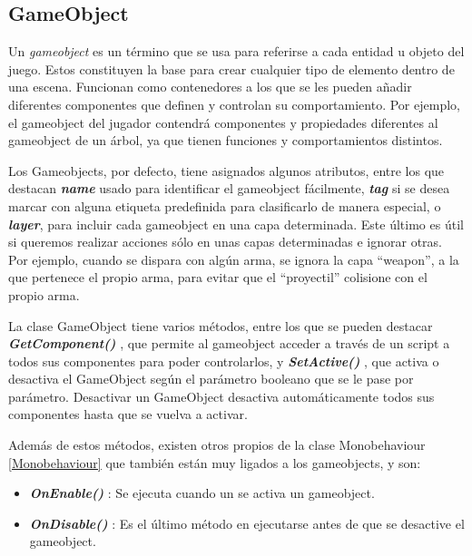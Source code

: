 \subsection{GameObject}
Un \textit{gameobject} \cite{doc:GameObject} es un término que se usa para referirse a cada entidad u objeto del juego. Estos constituyen la base para crear cualquier tipo de elemento dentro de una escena. Funcionan como contenedores a los que se les pueden añadir diferentes componentes que definen y controlan su comportamiento. Por ejemplo, el gameobject del jugador contendrá componentes y propiedades diferentes al gameobject de un árbol, ya que tienen funciones y comportamientos distintos.

Los Gameobjects, por defecto, tiene asignados algunos atributos, entre los que destacan \textbf{\textit{name}} usado para identificar el gameobject fácilmente, \textbf{\textit{tag}} si se desea marcar con alguna etiqueta predefinida para clasificarlo de manera especial, o \textbf{\textit{layer}}, para incluir cada gameobject en una capa determinada. Este último es útil si queremos realizar acciones sólo en unas capas determinadas e ignorar otras. Por ejemplo, cuando se dispara con algún arma, se ignora la capa “weapon”, a la que pertenece el propio arma, para evitar que el “proyectil” colisione con el propio arma.

La clase GameObject tiene varios métodos, entre los que se pueden destacar \textbf{\textit{GetComponent()}} \cite{doc:GetComponent}, que permite al gameobject acceder a través de un script a todos sus componentes para poder controlarlos, y \textbf{\textit{SetActive()}} \cite{doc:SetActive}, que activa o desactiva el GameObject según el parámetro booleano que se le pase por parámetro. Desactivar un GameObject desactiva automáticamente todos sus componentes hasta que se vuelva a activar.

Además de estos métodos, existen otros propios de la clase Monobehaviour \ref{Monobehaviour} que también están muy ligados a los gameobjects, y son:
\begin{itemize}
\tightlist
	\item \textbf{\textit{OnEnable()}} \cite{doc:OnEnable}: Se ejecuta cuando un se activa un gameobject.
	\item \textbf{\textit{OnDisable()}} \cite{doc:OnDisable}: Es el último método en ejecutarse antes de que se desactive el gameobject.
\end{itemize}

